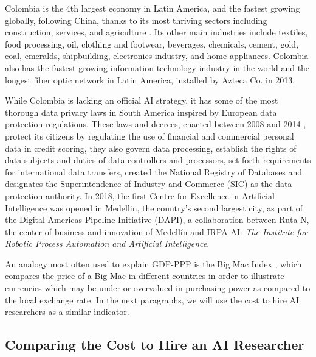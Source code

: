 \documentclass[conference]{IEEEtran}
\begin{document}
Colombia is the 4th largest economy in Latin America, and the fastest growing globally, following China, thanks to its most thriving sectors including construction, services, and agriculture \cite{giraldo2019commodity}. Its other main industries include textiles, food processing, oil, clothing and footwear, beverages, chemicals, cement, gold, coal, emeralds, shipbuilding, electronics industry, and home appliances. Colombia also has the fastest growing information technology industry in the world and the longest fiber optic network in Latin America, installed by Azteca Co. in 2013.

While Colombia is lacking an official AI strategy, it has some of the most thorough data privacy laws in South America inspired by European data protection regulations. These laws and decrees, enacted between 2008 and 2014 \cite{piper2016data}, protect its citizens by regulating the use of financial and commercial personal data in credit scoring, they also govern data processing, establish the rights of data subjects and duties of data controllers and processors, set forth requirements for international data transfers, created the National Registry of Databases and designates the Superintendence of Industry and Commerce (SIC) as the data protection authority. In 2018, the first Centre for Excellence in Artificial Intelligence was opened in Medellin, the country's second largest city, as part of the Digital Americas Pipeline Initiative (DAPI), a collaboration between Ruta N, the center of business and innovation of Medellín and IRPA AI: \emph{The Institute for Robotic Process Automation and Artificial Intelligence}.

An analogy most often used to explain GDP-PPP is the Big Mac Index \cite{o2017adjusted}, which compares the price of a Big Mac in different countries in order to illustrate currencies which may be under or overvalued in purchasing power as compared to the local exchange rate. In the next paragraphs, we will use the cost to hire AI researchers as a similar indicator.


\subsection{Comparing the Cost to Hire an AI Researcher}
\end{document}
